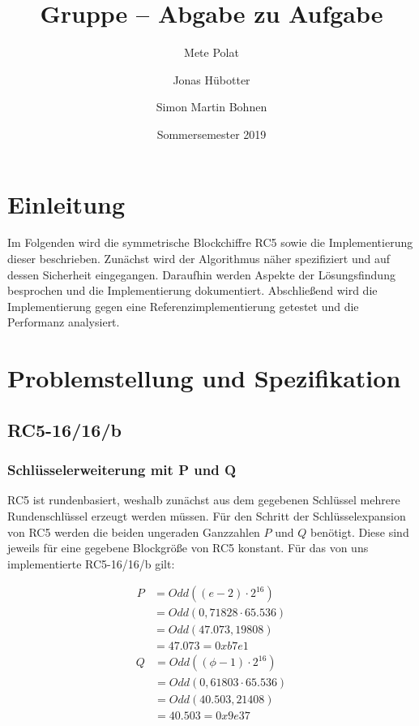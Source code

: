 \documentclass[course=erap]{aspdoc}
\author{Mete Polat \and Jonas Hübotter \and Simon Martin Bohnen}
\date{Sommersemester 2019} %
\title{Gruppe \theGroup{} -- Abgabe zu Aufgabe \theNumber}
\begin{document}
\maketitle

\section{Einleitung}

Im Folgenden wird die symmetrische Blockchiffre RC5 sowie die Implementierung dieser beschrieben. Zunächst wird der Algorithmus näher spezifiziert und auf dessen Sicherheit eingegangen. Daraufhin werden Aspekte der Lösungsfindung besprochen und die Implementierung dokumentiert. Abschließend wird die Implementierung gegen eine Referenzimplementierung getestet und die Performanz analysiert.

\section{Problemstellung und Spezifikation}

\subsection{RC5-16/16/b}

\subsubsection{Schlüsselerweiterung mit P und Q}

RC5 ist rundenbasiert, weshalb zunächst aus dem gegebenen Schlüssel mehrere Rundenschlüssel erzeugt werden müssen. Für den Schritt der Schlüsselexpansion von RC5 werden die beiden ungeraden Ganzzahlen $P$ und $Q$ benötigt. Diese sind jeweils für eine gegebene Blockgröße von RC5 konstant. Für das von uns implementierte RC5-16/16/b gilt:

\begin{multicols}{2}
\noindent
\begin{align*}
P &= Odd((e - 2) \cdot 2^{16}) \\
  &= Odd(0,71828 \cdot 65.536) \\
  &= Odd(47.073,19808) \\
  &= 47.073 = 0xb7e1
\end{align*}
\begin{align*}
Q &= Odd((\phi - 1) \cdot 2^{16}) \\
  &= Odd(0,61803 \cdot 65.536) \\
  &= Odd(40.503,21408) \\
  &= 40.503 = 0x9e37
\end{align*}
\end{multicols}
\end{document}
